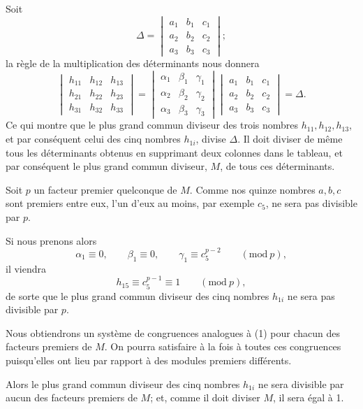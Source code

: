 \documentclass{article}
\begin{document}
Soit
\[ \Delta = \begin{vmatrix} a_{1} & b_{1} & c_{1} \\[1ex] a_{2} & b_{2} & c_{2} \\[1ex] a_{3} & b_{3} & c_{3} \end{vmatrix}; \]
la règle de la multiplication des déterminants nous donnera
\[ \begin{vmatrix} h_{11} & h_{12} & h_{13} \\[1ex] h_{21} & h_{22} & h_{23} \\[1ex] h_{31} & h_{32} & h_{33} \end{vmatrix} = \begin{vmatrix} \alpha_{1} & \beta_{1} & \gamma_{1} \\[1ex] \alpha_{2} & \beta_{2} & \gamma_{2} \\[1ex] \alpha_{3} & \beta_{3} & \gamma_{3} \end{vmatrix} \begin{vmatrix} a_{1} & b_{1} & c_{1} \\[1ex] a_{2} & b_{2} & c_{2} \\[1ex] a_{3} & b_{3} & c_{3} \end{vmatrix} = \Delta. \]
Ce qui montre que le plus grand commun diviseur des trois nombres $h_{11}, h_{12}, h_{13}$, et par conséquent celui des cinq nombres $h_{1i}$, divise $\Delta$. Il doit diviser de même tous les déterminants obtenus en supprimant deux colonnes dans le tableau, et par conséquent le plus grand commun diviseur, $M$, de tous ces déterminants.

Soit $p$ un facteur premier quelconque de $M$. Comme nos quinze nombres $a, b, c$ sont premiers entre eux, l'un d'eux au moins, par exemple $c_{5}$, ne sera pas divisible par $p$.

Si nous prenons alors
\[ \alpha_{1} \equiv 0, \qquad \beta_{1} \equiv 0, \qquad \gamma_{1} \equiv c^{p-2}_{5} \qquad (\text{mod}\ p), \tag{1} \]
il viendra
\[ h_{15} \equiv c^{p-1}_{5} \equiv 1 \qquad (\text{mod}\ p), \]
de sorte que le plus grand commun diviseur des cinq nombres $h_{1i}$ ne sera pas divisible par $p$.

Nous obtiendrons un système de congruences analogues à (1) pour chacun des facteurs premiers de $M$. On pourra satisfaire à la fois à toutes ces congruences puisqu'elles ont lieu par rapport à des modules premiers différents.

Alors le plus grand commun diviseur des cinq nombres $h_{1i}$ ne sera
divisible par aucun des facteurs premiers de $M$; et, comme il doit diviser $M$, il sera égal à 1.
\end{document}
